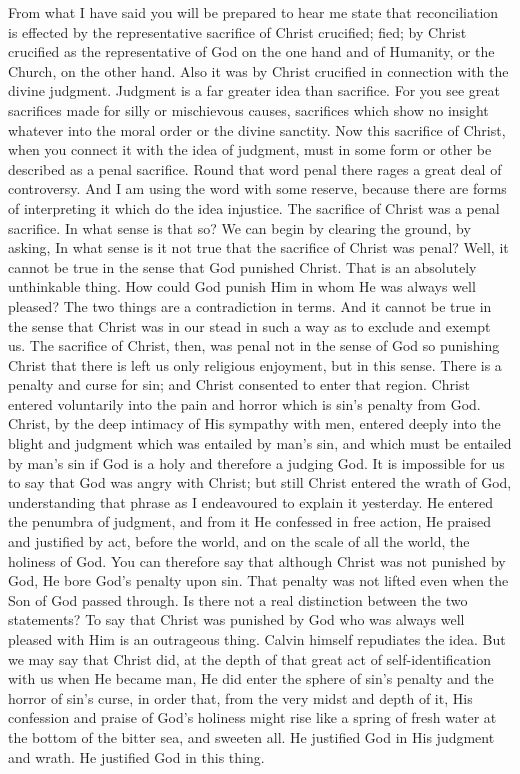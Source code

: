 \documentclass[12pt,a5paper,twoside,titlepage]{book}
\begin{document}
From what I have said you will be prepared 
to hear me state that reconciliation is effected 
by the representative sacrifice of Christ crucified;
fied; by Christ crucified as the representative of 
God on the one hand and of Humanity, or the 
Church, on the other hand. Also it was by 
Christ crucified in connection with the divine 
judgment. Judgment is a far greater idea than 
sacrifice. For you see great sacrifices made for 
silly or mischievous causes, sacrifices which show 
no insight whatever into the moral order or the 
divine sanctity. Now this sacrifice of Christ, 
when you connect it with the idea of judgment, 
must in some form or other be described as a 
penal sacrifice. Round that word penal there 
rages a great deal of controversy. And I am 
using the word with some reserve, because there 
are forms of interpreting it which do the idea 
injustice. The sacrifice of Christ was a penal 
sacrifice. In what sense is that so? We can 
begin by clearing the ground, by asking, In 
what sense is it not true that the sacrifice of 
Christ was penal? Well, it cannot be true in 
the sense that God punished Christ. That is an 
absolutely unthinkable thing. How could God 
punish Him in whom He was always well 
pleased? The two things are a contradiction 
in terms. And it cannot be true in the sense 
that Christ was in our stead in such a way as 
to exclude and exempt us. The sacrifice of 
Christ, then, was penal not in the sense of God 
so punishing Christ that there is left us only 
religious enjoyment, but in this sense. There is 
a penalty and curse for sin; and Christ consented 
to enter that region. Christ entered voluntarily 
into the pain and horror which is sin's penalty 
from God. Christ, by the deep intimacy of His 
sympathy with men, entered deeply into the 
blight and judgment which was entailed by 
man's sin, and which must be entailed by man's 
sin if God is a holy and therefore a judging 
God. It is impossible for us to say that God 
was angry with Christ; but still Christ entered 
the wrath of God, understanding that phrase 
as I endeavoured to explain it yesterday. He 
entered the penumbra of judgment, and from 
it He confessed in free action, He praised and 
justified by act, before the world, and on the 
scale of all the world, the holiness of God. You 
can therefore say that although Christ was not 
punished by God, He bore God's penalty upon 
sin. That penalty was not lifted even when the 
Son of God passed through. Is there not a real 
distinction between the two statements? To 
say that Christ was punished by God who was 
always well pleased with Him is an outrageous 
thing. Calvin himself repudiates the idea. But 
we may say that Christ did, at the depth of that 
great act of self-identification with us when He 
became man, He did enter the sphere of sin's 
penalty and the horror of sin's curse, in order 
that, from the very midst and depth of it, His 
confession and praise of God's holiness might 
rise like a spring of fresh water at the bottom 
of the bitter sea, and sweeten all. He justified 
God in His judgment and wrath. He justified 
God in this thing. 
\end{document}
